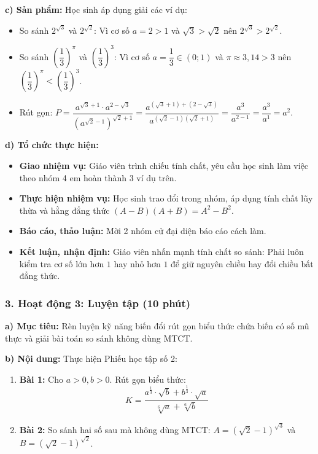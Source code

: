 \documentclass[12pt, a4paper]{article}
\begin{document}
\noindent \textbf{c) Sản phẩm:}
Học sinh áp dụng giải các ví dụ:
\begin{itemize}
    \item So sánh $2^{\sqrt{3}}$ và $2^{\sqrt{2}}$: Vì cơ số $a = 2 > 1$ và $\sqrt{3} > \sqrt{2}$ nên $2^{\sqrt{3}} > 2^{\sqrt{2}}$.
    \item So sánh $\left(\dfrac{1}{3}\right)^{\pi}$ và $\left(\dfrac{1}{3}\right)^{3}$: Vì cơ số $a = \dfrac{1}{3} \in (0; 1)$ và $\pi \approx 3{,}14 > 3$ nên $\left(\dfrac{1}{3}\right)^\pi < \left(\dfrac{1}{3}\right)^3$.
    \item Rút gọn: $P = \dfrac{a^{\sqrt{3} + 1} \cdot a^{2 - \sqrt{3}}}{(a^{\sqrt{2} - 1})^{\sqrt{2} + 1}} = \dfrac{a^{(\sqrt{3} + 1) + (2 - \sqrt{3})}}{a^{(\sqrt{2} - 1)(\sqrt{2} + 1)}} = \dfrac{a^3}{a^{2 - 1}} = \dfrac{a^3}{a^1} = a^2$.
\end{itemize}

\noindent \textbf{d) Tổ chức thực hiện:}
\begin{itemize}[leftmargin=0.6cm]
    \item \textbf{Giao nhiệm vụ:} Giáo viên trình chiếu tính chất, yêu cầu học sinh làm việc theo nhóm 4 em hoàn thành 3 ví dụ trên.
    \item \textbf{Thực hiện nhiệm vụ:} Học sinh trao đổi trong nhóm, áp dụng tính chất lũy thừa và hằng đẳng thức $(A-B)(A+B) = A^2 - B^2$.
    \item \textbf{Báo cáo, thảo luận:} Mời 2 nhóm cử đại diện báo cáo cách làm.
    \item \textbf{Kết luận, nhận định:} Giáo viên nhấn mạnh tính chất so sánh: Phải luôn kiểm tra cơ số lớn hơn $1$ hay nhỏ hơn $1$ để giữ nguyên chiều hay đổi chiều bất đẳng thức.
\end{itemize}

\subsubsection*{3. Hoạt động 3: Luyện tập (10 phút)}

\noindent \textbf{a) Mục tiêu:}
Rèn luyện kỹ năng biến đổi rút gọn biểu thức chứa biến có số mũ thực và giải bài toán so sánh không dùng MTCT.

\noindent \textbf{b) Nội dung:}
Thực hiện Phiếu học tập số 2:
\begin{enumerate}[leftmargin=0.6cm]
    \item \textbf{Bài 1:} Cho $a > 0, b > 0$. Rút gọn biểu thức:
    $$K = \dfrac{a^{\frac{1}{3}} \cdot \sqrt{b} + b^{\frac{1}{3}} \cdot \sqrt{a}}{\sqrt[6]{a} + \sqrt[6]{b}}$$
    \item \textbf{Bài 2:} So sánh hai số sau mà không dùng MTCT: $A = (\sqrt{2} - 1)^{\sqrt{3}}$ và $B = (\sqrt{2} - 1)^{\sqrt{2}}$.
\end{enumerate}
\end{document}
